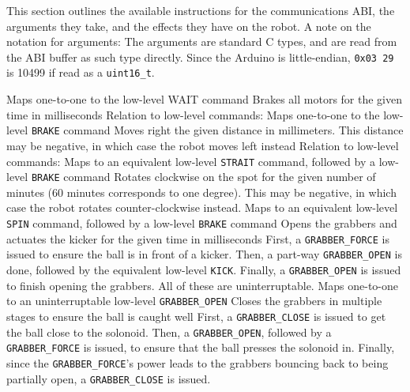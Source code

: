 This section outlines the available instructions for the communications ABI, the arguments they take, and the effects they have on the robot.
A note on the notation for arguments: The arguments are standard C types, and are read from the ABI buffer as such type directly. 
Since the Arduino is little-endian, \texttt{0x03 29} is 10499 if read as a \texttt{uint16\_t}.

    {Maps one-to-one to the low-level WAIT command}
    {Brakes all motors for the given time in milliseconds}
    {Relation to low-level commands: Maps one-to-one to the low-level
     \texttt{BRAKE} command}
    {Moves right the given distance in millimeters. This distance may be
     negative, in which case the robot moves left instead}
    {Relation to low-level commands: Maps to an equivalent low-level
     \texttt{STRAIT} command, followed by a low-level \texttt{BRAKE} command}
    {Rotates clockwise on the spot for the given number of minutes (60 minutes
     corresponds to one degree). This may be negative, in which case the robot
     rotates counter-clockwise instead.}
    {Maps to an equivalent low-level \texttt{SPIN} command, followed by a
     low-level \texttt{BRAKE} command}
    {Opens the grabbers and actuates the kicker for the given time in
     milliseconds}
    {First, a \texttt{GRABBER\_FORCE} is issued to ensure the ball is in front
     of a kicker. Then, a part-way \texttt{GRABBER\_OPEN} is done, followed by
     the equivalent low-level \texttt{KICK}. Finally, a \texttt{GRABBER\_OPEN}
     is issued to finish opening the grabbers. All of these are
     uninterruptable.}
    {Maps one-to-one to an uninterruptable low-level \texttt{GRABBER\_OPEN}}
    {Closes the grabbers in multiple stages to ensure the ball is caught well}
    {First, a \texttt{GRABBER\_CLOSE} is issued to get the ball close to the
     solonoid.  Then, a \texttt{GRABBER\_OPEN}, followed by a
     \texttt{GRABBER\_FORCE} is issued, to ensure that the ball presses the
     solonoid in. Finally, since the \texttt{GRABBER\_FORCE}'s power leads to
     the grabbers bouncing back to being partially open, a
     \texttt{GRABBER\_CLOSE} is issued.}
